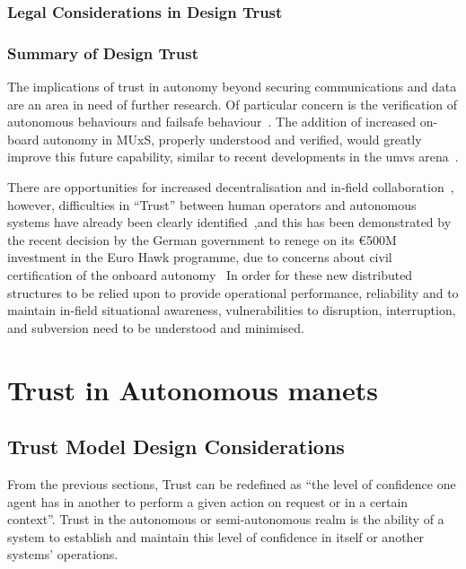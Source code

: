 \subsubsection{Legal Considerations in Design Trust}


\subsubsection{Summary of Design Trust}

The implications of trust in autonomy beyond securing communications and data are an area in need of further research.
Of particular concern is the verification of autonomous behaviours and failsafe behaviour~\cite{BAESystems2013}.
The addition of increased on-board autonomy in MUxS, properly understood and verified, would greatly improve this future capability, similar to recent developments in the \gls{umvs} arena~\cite{Cummings2010}.

There are opportunities for increased decentralisation and in-field collaboration~\cite{Walton2012}, however, difficulties in ``Trust'' between human operators and autonomous systems have already been clearly identified~\cite{Chen2011b},and this has been demonstrated by the recent decision by the German government to renege on its \euro500M investment in the Euro Hawk programme, due to concerns about civil certification of the onboard autonomy~\cite{Mehta2013}
In order for these new distributed structures to be relied upon to provide operational performance, reliability and to maintain in-field situational awareness, vulnerabilities to disruption, interruption, and subversion need to be understood and minimised.



\section{Trust in Autonomous \glspl{manet}}\label{sec:trust_manets}

\subsection{Trust Model Design Considerations}\label{sec:trust_model_design_considerations}

From the previous sections, Trust can be redefined as ``the level of confidence one agent has in another to perform a given action on request or in a certain context''.
Trust in the autonomous or semi-autonomous realm is the ability of a system to establish and maintain this level of confidence in itself or another systems' operations.

